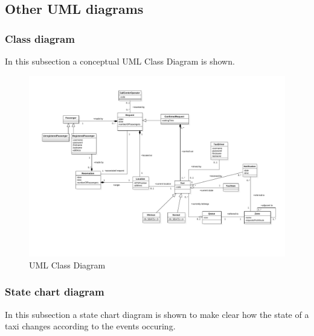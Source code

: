 \begin{landscape}


\subsection{Other UML diagrams}


\subsubsection{Class diagram}

In this subsection a conceptual UML Class Diagram is shown.

\begin{figure}[H]
\begin{centering}
\includegraphics[bb=25bp 100bp 842bp 580bp,scale=0.65]{specific-requirements/3.6-other-uml/image/class}
\par\end{centering}

\protect\caption{UML Class Diagram}
\end{figure}


\clearpage{}


\subsubsection{State chart diagram}

In this subsection a state chart diagram is shown to make clear how
the state of a taxi changes according to the events occuring.


\end{landscape}
